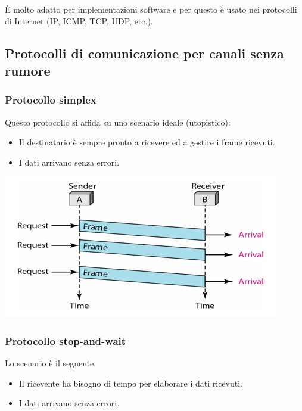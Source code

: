             \newpage
            

            È molto adatto per implementazioni software e per questo è usato nei protocolli di Internet (IP, ICMP, TCP, UDP, etc.).

    \subsection{Protocolli di comunicazione per canali senza rumore}
        \subsubsection{Protocollo simplex}
            Questo protocollo si affida su uno scenario ideale (utopistico):
            \begin{itemize}
                \item Il destinatario è sempre pronto a ricevere ed a gestire i frame ricevuti.
                \item I dati arrivano senza errori.
            \end{itemize}

            \begin{center}
                \includegraphics[scale=0.6]{chapters/3/assets/schema_g.png}
            \end{center}

        \subsubsection{Protocollo stop-and-wait}
            Lo scenario è il seguente:
            \begin{itemize}
                \item Il ricevente ha bisogno di tempo per elaborare i dati ricevuti.
                \item I dati arrivano senza errori.
            \end{itemize}

